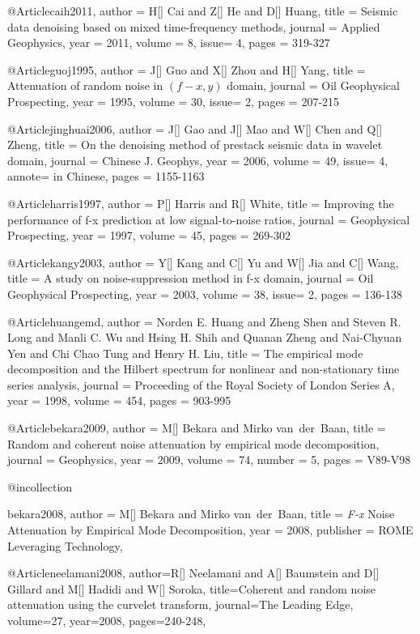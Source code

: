 @Article{caih2011,
  author = 	 {H[] Cai and Z[] He and D[] Huang},
  title = 	 {Seismic data denoising based on mixed time-frequency methods},
  journal = 	 {Applied Geophysics},
  year = 	 2011,
  volume =	 8,
  issue= 	 4,
  pages =	 {319-327}
}

@Article{guoj1995,
  author = 	 {J[] Guo and X[] Zhou and H[] Yang},
  title = 	 {Attenuation of random noise in $(f-x,y)$ domain},
  journal = 	 {Oil Geophysical Prospecting},
  year = 	 1995,
  volume =	 30,
  issue=        2,
  pages =	 {207-215}
}

@Article{jinghuai2006,
  author = 	 {J[] Gao and J[] Mao and W[] Chen and Q[] Zheng},
  title = 	 {On the denoising method of prestack seismic data in wavelet domain},
  journal = 	 {Chinese J. Geophys},
  year = 	 2006,
  volume =	 49,
  issue= 	 4,
  annote=        {in Chinese},
  pages =	 {1155-1163}
}

@Article{harris1997,
  author = 	 {P[] Harris and R[] White},
  title = 	 {Improving the performance of f-x prediction at low signal-to-noise ratios},
  journal = 	 {Geophysical Prospecting},
  year = 	 1997,
  volume =	 45,
  pages =	 {269-302}
}


@Article{kangy2003,
  author = 	 {Y[] Kang and C[] Yu and W[] Jia and C[] Wang},
  title = 	 {A study on noise-suppression method in f-x domain},
  journal = 	 {Oil Geophysical Prospecting},
  year = 	 2003,
  volume =	 38,
  issue=        2,
  pages =	 {136-138}
}

@Article{huangemd,
  author = 	 {Norden E. Huang and Zheng Shen and Steven R. Long and Manli C. Wu and Hsing H. Shih and Quanan Zheng and Nai-Chyuan Yen and Chi Chao Tung and Henry H. Liu},
  title = 	 {The empirical mode decomposition and the {Hilbert} spectrum for nonlinear and non-stationary time series analysis},
  journal = 	 {Proceeding of the Royal Society of London Series A},
  year = 	 1998,
  volume = 	 454,
  pages = 	 {903-995}}

@Article{bekara2009,
  author = 	 {M[] Bekara and Mirko van~der~Baan},
  title = 	 {Random and coherent noise attenuation by empirical mode decomposition},
  journal = 	 {Geophysics},
  year = 	 2009,
  volume = 	 74,
  number = 	 5,
  pages = 	 {V89-V98}}

@incollection{bekara2008,
author = {M[] Bekara and Mirko van~der~Baan},
title = { \emph{F-x} Noise Attenuation by Empirical Mode Decomposition},
year = {2008},
publisher = {ROME Leveraging Technology},

}

@Article{neelamani2008,
author={R[] Neelamani and A[] Baumstein and D[] Gillard and M[] Hadidi and W[] Soroka},
title={Coherent and random noise attenuation using the curvelet transform},
journal={The Leading Edge},
volume=27,
year=2008,
pages={240-248},
}


